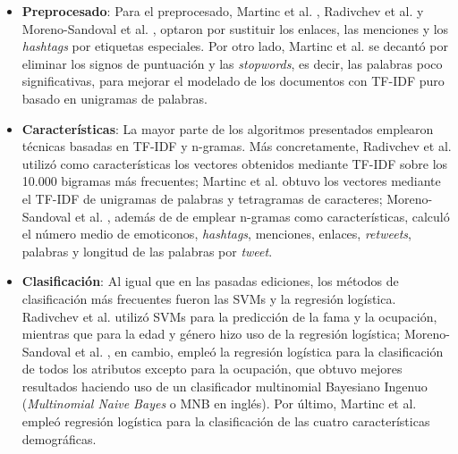\begin{itemize}
	\item \textbf{Preprocesado}: Para el preprocesado, Martinc et al. \cite{martinc2019hot}, Radivchev et al. \cite{radivchev2019celebrity}
	      y Moreno-Sandoval et al. \cite{moreno2019celebrity}, optaron por sustituir los enlaces,
	      las menciones y los \textit{hashtags} por etiquetas especiales. Por otro lado, Martinc et al. \cite{martinc2019hot} se decantó por eliminar los signos de puntuación
	      y las \textit{stopwords}, es decir, las palabras poco significativas, para mejorar el modelado de los documentos con TF-IDF puro basado en unigramas de palabras.
	\item \textbf{Características}: La mayor parte de los algoritmos presentados emplearon técnicas basadas en TF-IDF y n-gramas.
	      Más concretamente, Radivchev et al. \cite{radivchev2019celebrity} utilizó como características los vectores obtenidos mediante TF-IDF sobre los 10.000 bigramas más frecuentes;
	      Martinc et al. \cite{martinc2019hot} obtuvo los vectores mediante el TF-IDF de unigramas de palabras y tetragramas de caracteres; Moreno-Sandoval et al. \cite{moreno2019celebrity}, además de
	      de emplear n-gramas como características, calculó el número medio de emoticonos, \textit{hashtags}, menciones, enlaces, \textit{retweets}, palabras y longitud de las
	      palabras por \textit{tweet}.
	\item \textbf{Clasificación}: Al igual que en las pasadas ediciones, los métodos de clasificación más frecuentes fueron las
	      SVMs y la regresión logística. Radivchev et al. \cite{radivchev2019celebrity} utilizó SVMs para la predicción de la fama y la ocupación, mientras que para la edad y género
	      hizo uso de la regresión logística; Moreno-Sandoval et al. \cite{moreno2019celebrity}, en cambio, empleó la regresión logística para la clasificación de todos los atributos
	      excepto para la ocupación, que obtuvo mejores resultados haciendo uso de un clasificador multinomial Bayesiano Ingenuo (\textit{Multinomial Naive Bayes} o MNB en inglés).
	      Por último, Martinc et al. \cite{martinc2019hot} empleó regresión logística para la clasificación de las cuatro características demográficas.
\end{itemize}

